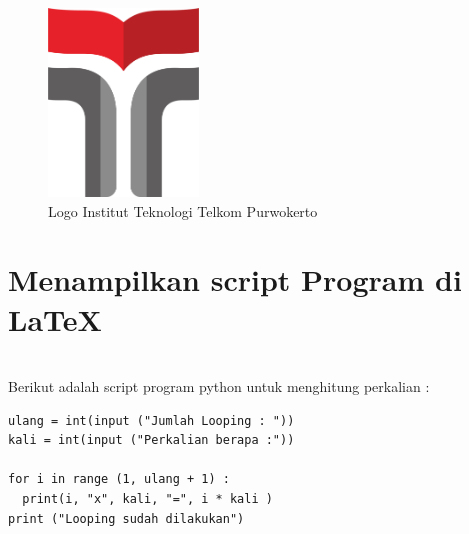 \documentclass[a4paper,12 pt]{article}
\begin{document}
\begin{figure}[htp]
	\centering
	\includegraphics[width=4cm,height=5cm]{logo}
	\caption{Logo Institut Teknologi Telkom Purwokerto}
	\label{fig:logo}
\end{figure}

\section{Menampilkan script Program di \LaTeX}
\blindtext\\
\linebreak
Berikut adalah script program python untuk menghitung perkalian :

\begin{verbatim}
ulang = int(input ("Jumlah Looping : "))
kali = int(input ("Perkalian berapa :")) 

for i in range (1, ulang + 1) :
  print(i, "x", kali, "=", i * kali )
print ("Looping sudah dilakukan")
\end{verbatim}
\end{document}
